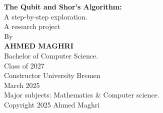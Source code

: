 \thispagestyle{empty}

\begin{center}
    \Large\textbf{The Qubit and Shor's Algorithm:}\\[0.5cm]
    \Large A step-by-step exploration.\\[3cm]

    \normalsize A research project\\[0.2cm]
    By\\[0.2cm]
    \textbf{AHMED MAGHRI}\\[3cm]

    \normalsize Bachelor of Computer Science.\\[0.2cm]
    Class of 2027\\[0.2cm]
    Constructor University Bremen\\[3.cm]


    March 2025\\
    Major subjects: Mathematics \& Computer science.\\[3cm]

    Copyright 2025 Ahmed Maghri

\end{center}
